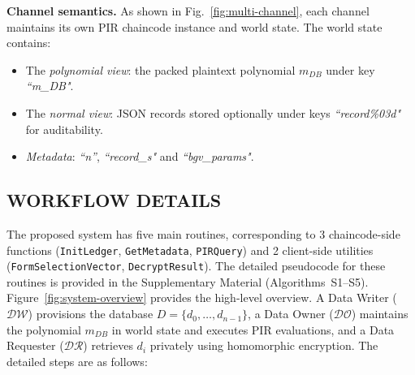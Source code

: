 \documentclass{ieeetj}
\begin{document}
\noindent\textbf{Channel semantics.}  
As shown in Fig.~\ref{fig:multi-channel}, each channel maintains its own PIR chaincode instance and world state. 
The world state contains:
\begin{itemize}
    \item The \emph{polynomial view}: the packed plaintext polynomial \emph{$m_{DB}$} under key \emph{``m\_DB"}.
    \item The \emph{normal view}: JSON records stored optionally under keys \emph{``record\%03d"} for auditability.
    \item \emph{Metadata}: \emph{``n''}, \emph{``record\_s"} and \emph{``bgv\_params"}.
\end{itemize}

\subsection{WORKFLOW DETAILS}
The proposed system has five main routines, corresponding to 3 chaincode-side functions 
(\texttt{InitLedger}, \texttt{GetMetadata}, \texttt{PIRQuery}) and 2 client-side utilities (\texttt{FormSelectionVector}, 
\texttt{DecryptResult}). The detailed pseudocode for these routines is provided in the Supplementary Material (Algorithms~S1–S5).
Figure~\ref{fig:system-overview} provides the high-level overview. 
A Data Writer ($\mathcal{DW}$) provisions the database $D=\{d_0,\dots,d_{n-1}\}$, 
a Data Owner ($\mathcal{DO}$) maintains the polynomial \emph{$m_{DB}$} in world state and executes PIR evaluations, 
and a Data Requester ($\mathcal{DR}$) retrieves $d_i$ privately using homomorphic encryption.
The detailed steps are as follows:
\end{document}

